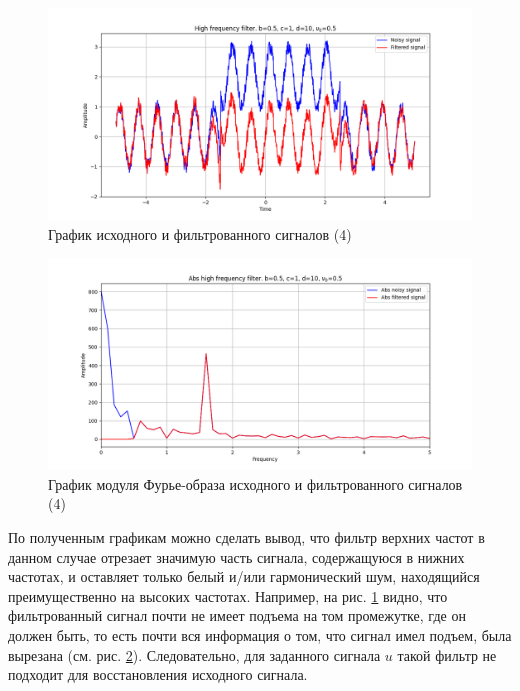 \documentclass[a4paper, 12pt]{article}
\begin{document}
    \begin{figure}[H]
        \centering
        \includegraphics[scale=0.48]{4_nolow.png}
        \captionsetup{skip=0pt}
        \caption{График исходного и фильтрованного сигналов (4)}
        \label{fig:fig33}
    \end{figure}
    \begin{figure}[H]
        \centering
        \includegraphics[scale=0.48]{4_abs_nolow.png}
        \captionsetup{skip=0pt}
        \caption{График модуля Фурье-образа исходного и фильтрованного сигналов (4)}
        \label{fig:fig34}
    \end{figure}
    
    
    По полученным графикам можно сделать вывод, что фильтр верхних частот в данном случае отрезает значимую часть сигнала,
    содержащуюся в нижних частотах, и оставляет только белый и/или гармонический шум, находящийся преимущественно на высоких частотах.
    Например, на рис. \ref{fig:fig33} видно, что фильтрованный сигнал почти не имеет подъема на том промежутке, где он должен быть, то есть
    почти вся информация о том, что сигнал имел подъем, была вырезана (см. рис. \ref{fig:fig34}).
    Следовательно, для заданного сигнала $u$ такой фильтр не
    подходит для восстановления исходного сигнала.
\end{document}
